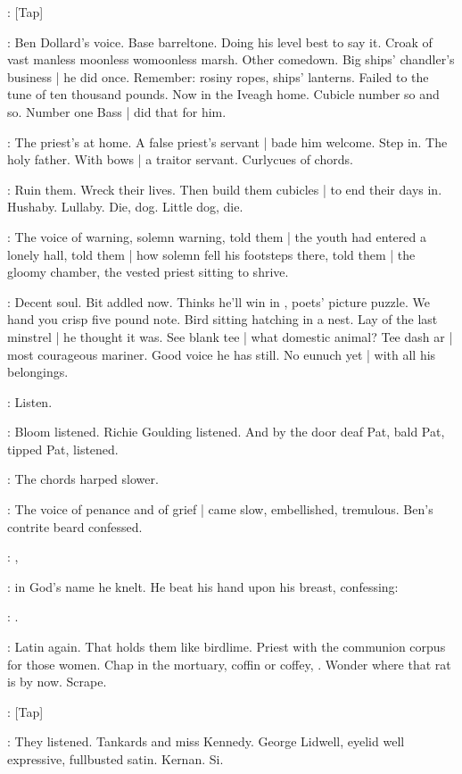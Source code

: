 \stripling:
[Tap]

\BloomInt:
Ben Dollard's voice.
Base barreltone.
Doing his level best to say it.
Croak of vast manless moonless womoonless marsh.
Other comedown.
Big ships' chandler's business |
he did once.
Remember:
rosiny ropes,
ships' lanterns.
Failed to the tune of ten thousand pounds.
Now in the Iveagh home.
Cubicle number so and so.
Number one Bass |
did that for him.

:
The priest's at home.
A false priest's servant |
bade him welcome.
Step in.
The holy father.
With bows |
a traitor servant.
Curlycues of chords.

\BloomInt:
Ruin them.
Wreck their lives.
Then build them cubicles |
to end their days in.
Hushaby.
Lullaby.
Die,
dog.
Little dog,
die.

:
The voice of warning,
solemn warning,
told them |
the youth had entered a lonely hall,
told them |
how solemn fell his footsteps there,
told them |
the gloomy chamber,
the vested priest sitting to shrive.

\BloomInt:
Decent soul.
Bit addled now.
Thinks he'll win in ,
poets' picture puzzle.
We hand you crisp five pound note.
Bird sitting hatching in a nest.
Lay of the last minstrel |
he thought it was.
See blank tee |
what domestic animal?
Tee dash ar |
most courageous mariner.
Good voice he has still.
No eunuch yet |
with all his belongings.

\BloomInt:
Listen.

:
Bloom listened.
Richie Goulding listened.
And by the door
deaf Pat,
bald Pat,
tipped Pat,
listened.

:
The chords harped slower.

:
The voice of penance and of grief |
came slow,
embellished,
tremulous.
Ben's contrite beard confessed.

\dollard:
,

:
in God's name he knelt.
He beat his hand upon his breast,
confessing:

\dollard:
.

\BloomInt:
Latin again.
That holds them like birdlime.
Priest with the communion corpus for those women.
Chap in the mortuary,
coffin or coffey,
.
Wonder where that rat is by now.
Scrape.

\stripling:
[Tap]

:
They listened.
Tankards and miss Kennedy.
George Lidwell,
eyelid well expressive,
fullbusted satin.
Kernan.
Si.

